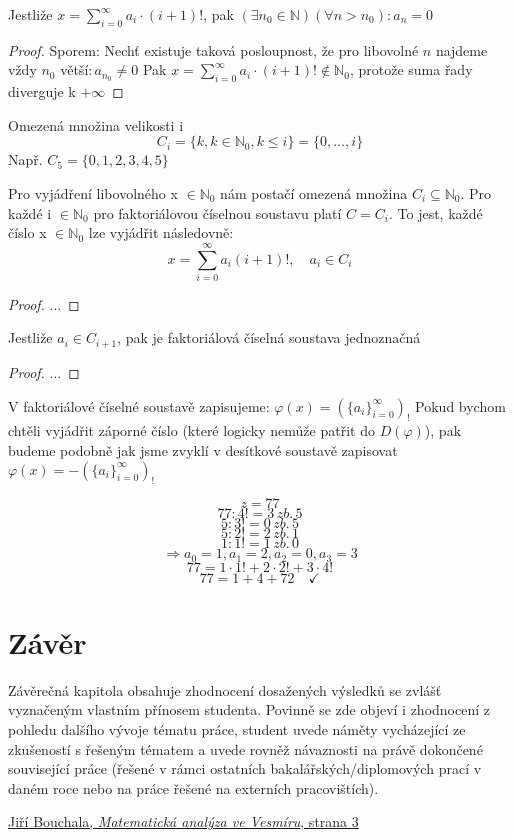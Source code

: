 \documentclass[czech,bachelor,dept470,male]{diploma}
\newcommand{\posla}{\{a_i\}_{i=0}^{\infty}}
\begin{document}
\begin{theorem}
	Jestliže $x=\sum_{i=0}^{\infty}a_i\cdot(i+1)!$, pak $(\exists n_0 \in \mathbb{N})(\forall n>n_0):a_n=0$
\end{theorem}
\begin{proof}
	Sporem: \newline Nechť existuje taková posloupnost, že pro libovolné $n$ najdeme vždy $n_0$ větší$:a_{n_0}\ne0$\newline
	Pak $x=\sum_{i=0}^\infty a_i\cdot(i+1)! \notin \mathbb{N}_0$, protože suma řady diverguje k $+\infty$
\end{proof}
\begin{definition}
	Omezená množina velikosti i\newline
	$$C_i=\{k,k\in\mathbb{N}_0,k\le i\}=\{0,\dots,i\}$$
	Např. $C_5 = \{0,1,2,3,4,5\}$
\end{definition}
\begin{theorem}
	Pro vyjádření libovolného x $\in\mathbb{N}_0$ nám postačí omezená množina $C_i\subseteq\mathbb{N}_0$. Pro každé i $\in \mathbb{N}_0$ pro faktoriálovou číselnou soustavu platí $C=C_i$. To jest, každé číslo x $\in\mathbb{N}_0$ lze vyjádřit následovně:
	$$x=\sum_{i=0}^{\infty}a_i(i+1)!,\quad a_i\in C_i$$
\end{theorem}
\begin{proof}
	...
\end{proof}
\begin{theorem}
	Jestliže $a_i \in C_{i+1}$, pak je faktoriálová číselná soustava jednoznačná
\end{theorem}
\begin{proof}
	...
\end{proof}
\begin{agreement}
	V faktoriálové číselné soustavě zapisujeme:
	$\varphi(x) =  (\posla)_!$\newline
	Pokud bychom chtěli vyjádřit záporné číslo (které logicky nemůže patřit do $D(\varphi)$), pak budeme podobně jak jsme zvyklí v desítkové soustavě zapisovat $\varphi(x) = - (\posla)_!$
\end{agreement}

\begin{example}
	$$z=77$$
	$$77:4!=3\,zb.\,5$$
	$$5:3!=0\,zb.\,5$$
	$$5:2!=2\,zb.\,1$$
	$$1:1!=1\,zb.\,0$$
	$$\Rightarrow a_0=1, a_1=2,a_2=0,a_3=3$$
	$$ 77 = 1 \cdot 1! + 2 \cdot 2! + 3\cdot 4!$$
	$$ 77 = 1 + 4 + 72 \quad \checkmark$$
\end{example}

\section{Závěr}
Závěrečná kapitola obsahuje zhodnocení dosažených výsledků se zvlášť vyznačeným vlastním přínosem studenta. Povinně
se zde objeví i zhodnocení z pohledu dalšího vývoje tématu práce, student uvede náměty vycházející ze zkušeností s řešeným
tématem a uvede rovněž návaznosti na právě dokončené související práce (řešené v rámci ostatních bakalářských/diplomových
prací v daném roce nebo na práce řešené na externích pracovištích).

\begin{thebibliography}{1}
	 \href{https://homel.vsb.cz/~bou10/MA1/4.pdf}{Jiří Bouchala, \emph{Matematická analýza ve Vesmíru}, strana 3}
\end{thebibliography}
\end{document}
